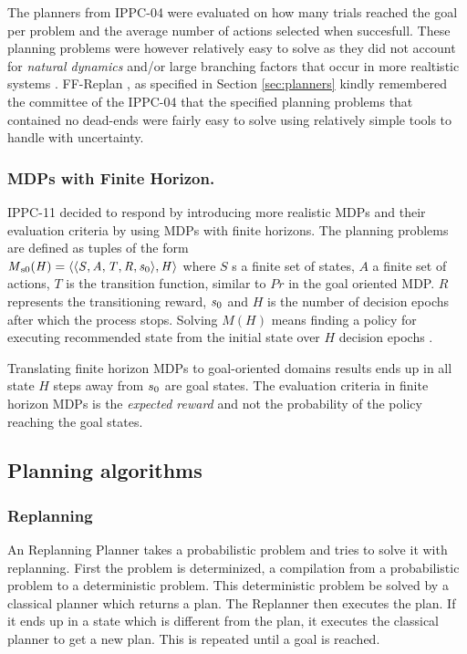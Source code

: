 \documentclass[runningheads,a4paper]{llncs}
\begin{document}
 The planners from IPPC-04 were evaluated on how many trials reached the goal per problem and the average number of actions selected when succesfull. These planning problems were however relatively easy to solve as they did not account for \emph{natural dynamics} and/or large branching factors that occur in more realtistic systems \cite{kolobov2012glutton}. FF-Replan \cite{FFReplan}, as specified in Section \ref{sec:planners} kindly remembered the committee of the IPPC-04 that the specified planning problems that contained no dead-ends were fairly easy to solve using relatively simple tools to handle with uncertainty. 

\subsubsection{MDPs with Finite Horizon. }IPPC-11 decided to respond by introducing more realistic MDPs and their evaluation criteria by using MDPs with finite horizons. The planning problems are defined as tuples of the form \\ $\mathit{M\textsubscript{s0}(H) = \langle \langle S, A, T, R, s\textsubscript{0} \rangle , H \rangle }$ where $\mathit{S}$ s a finite set of states, $\mathit{A}$ a finite set of actions, $\mathit{T}$ is the transition function, similar to $\mathit{Pr}$ in the goal oriented MDP. $\mathit{R}$ represents the transitioning reward, $\mathit{s\textsubscript{0}}$ and $\mathit{H}$ is the number of decision epochs after which the process stops. Solving $\mathit{M(H)}$ means finding a policy for executing recommended state from the initial state over $\mathit{H}$ decision epochs \cite{kolobov2012gourmand}.

Translating finite horizon MDPs to goal-oriented domains results ends up in all state $H$ steps away from $s\textsubscript{0}$ are goal states. The evaluation criteria in finite horizon MDPs is the \emph{expected reward} and not the probability of the policy reaching the goal states.

\subsection{Planning algorithms}
\subsubsection{Replanning}

An Replanning Planner takes a probabilistic problem and tries to solve it with
replanning. First the problem is determinized, a compilation from a
probabilistic problem to a deterministic problem. This deterministic problem
be solved by a classical planner which returns a plan. The Replanner then
executes the plan. If it ends up in a state which is different from the plan,
it executes the classical planner to get a new plan. This is repeated until a
goal is reached.
\end{document}
